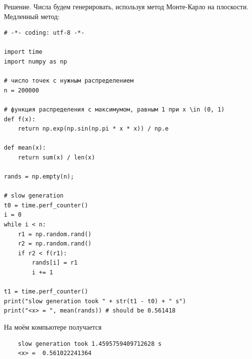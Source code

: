 \documentclass{book}
\begin{document}
Решение. Числа будем генерировать, используя метод Монте-Карло на плоскости. Медленный метод:
\begin{verbatim}
# -*- coding: utf-8 -*-

import time
import numpy as np

# число точек с нужным распределением
n = 200000

# функция распределения с максимумом, равным 1 при x \in (0, 1)
def f(x):
    return np.exp(np.sin(np.pi * x * x)) / np.e

def mean(x):
    return sum(x) / len(x)

rands = np.empty(n);

# slow generation
t0 = time.perf_counter()
i = 0
while i < n:
    r1 = np.random.rand()
    r2 = np.random.rand()
    if r2 < f(r1):
        rands[i] = r1
        i += 1

t1 = time.perf_counter()
print("slow generation took " + str(t1 - t0) + " s")
print("<x> = ", mean(rands)) # should be 0.561418
\end{verbatim}
На моём компьютере получается
\begin{verbatim}
    slow generation took 1.4595759409712628 s
    <x> =  0.561022241364
\end{verbatim}
\end{document}
